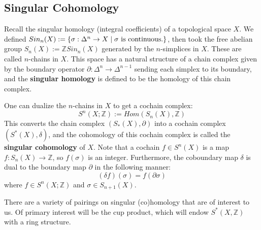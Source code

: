 \documentclass[11pt, oneside]{article}   	%
\theoremstyle{definition}
\begin{document}
\subsection{Singular Cohomology}

Recall the singular homology (integral coefficients) of a topological space $X$. We defined $Sin_n(X) := \{\sigma : 
\Delta^n\rightarrow X\; | \;\sigma\textnormal{ is continuous.}\}$, then took the free abelian group $S_n(X) := \mathbb Z 
Sin_n(X)$ generated by the $n$-simplices in $X$. These are called $n$-chains in $X$. This space has a natural structure of a 
chain complex given by the boundary operator $\partial : \Delta^n\rightarrow\Delta^{n - 1}$ sending each simplex to its 
boundary, and the \textbf{singular homology} is defined to be the homology of this chain complex.

One can dualize the $n$-chains in $X$ to get a cochain complex:
\begin{equation}
	S^n(X; \mathbb Z) := Hom(S_n(X), \mathbb Z)
\end{equation}
This converts the chain complex $(S_*(X), \partial)$ into a cochain complex $(S^*(X), \delta)$, and the cohomology of this 
cochain complex is called the \textbf{singular cohomology} of $X$. Note that a cochain $f\in S^n(X)$ is a map $f : 
S_n(X)\rightarrow\mathbb Z$, so $f(\sigma)$ is an integer. Furthermore, the coboundary map $\delta$ is dual to the 
boundary map $\partial$ in the following manner:
\begin{equation}
	(\delta f)(\sigma) = f(\partial\sigma)
\end{equation}
where $f\in S^n(X; \mathbb Z)$ and $\sigma\in S_{n + 1}(X)$. 

There are a variety of pairings on singular (co)homology that are of interest to us. Of primary interest will be the cup product, 
which will endow $S^*(X, \mathbb Z)$ with a ring structure. 
\end{document}
